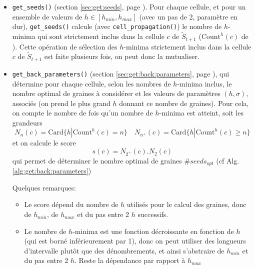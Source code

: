\documentclass{article}
\begin{document}
\begin{itemize}
\begin{itemize}
\item \texttt{get\_seeds()} (section \ref{sec:get:seeds}, page \pageref{sec:get:seeds}). Pour chaque cellule, et pour un ensemble de valeurs de $h \in [h_{min}, h_{max}]$ (avec un pas de 2, param\`etre en dur), \texttt{get\_seeds()} calcule (avec \texttt{cell\_propagation()}) le nombre de  $h$-minima qui sont strictement inclus dans la cellule $c$ de $\tilde{S}_{t+1}$ ($\mathrm{Count}^{h}(c)$ de \cite[section 2.3.3.5, page 71]{guignard:tel-01278725}). Cette op\'eration de s\'election des $h$-minima strictement inclus dans la cellule  $c$ de $\tilde{S}_{t+1}$ est faite plusieurs fois, on peut donc la mutualiser.





\item \texttt{get\_back\_parameters()} (section \ref{sec:get:back:parameters}, page \pageref{sec:get:back:parameters}), qui d\'etermine pour chaque cellule, selon les nombres de $h$-minima inclus, le nombre optimal de graines \`a consid\'erer et les valeurs de param\`etres $(h, \sigma)$, associ\'es (on prend le plus grand $h$ donnant ce nombre de graines). Pour cela, on compte le nombre de fois qu'un nombre de $h$-minima est atteint, soit les grandeurs
\begin{displaymath}
N_{n}(c) = \mathrm{Card} \{ h | \mathrm{Count}^{h}(c) = n\}
\quad 
N_{n^{+}}(c) = \mathrm{Card} \{ h | \mathrm{Count}^{h}(c) \geq n\}
\end{displaymath}
et on calcule le score 
\begin{displaymath}
s(c) = N_{2^{+}}(c) . N_2(c)
\end{displaymath}
qui permet de d\'eterminer le nombre optimal de graines $\# seeds_{opt} $ (cf Alg. \ref{alg:get:back:parameters})

Quelques remarques:
\begin{itemize}
\item Le score d\'epend du nombre de $h$ utilis\'es pour le calcul des graines, donc de $h_{min}$, de $h_{max}$ et du pas entre 2 $h$ successifs.
\item Le nombre de $h$-minima est une fonction d\'ecroissante en fonction de $h$ (qui est born\'e inf\'erieurement par 1), donc on peut utiliser des longueurs d'intervalle plut\^ot que des d\'enombrements, et  ainsi s'abstraire de $h_{min}$ et du pas entre 2 $h$. Reste la d\'ependance par rapport \`a $h_{max}$
\end{itemize}





\end{itemize}
\end{itemize}
\end{document}
